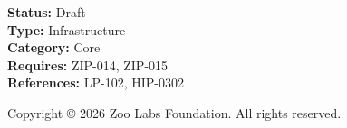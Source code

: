 \documentclass[twocolumn,11pt]{article}
\begin{document}
\vspace{1em}
\noindent\textbf{Status:} Draft\\
\noindent\textbf{Type:} Infrastructure\\
\noindent\textbf{Category:} Core\\
\noindent\textbf{Requires:} ZIP-014, ZIP-015\\
\noindent\textbf{References:} LP-102, HIP-0302

\vspace{0.5em}
\noindent Copyright \copyright{} 2026 Zoo Labs Foundation.
All rights reserved.
\end{document}
